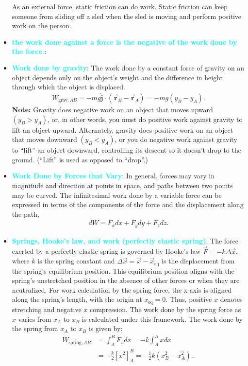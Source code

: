 \documentclass{report}
\begin{document}
\begin{itemize}
            \bigbreak \noindent 
            As an external force, static friction can do work. Static friction can keep someone from sliding off a sled when the sled is moving and perform positive work on the person. 
        \item \textbf{\textcolor{cyan}{the work done against a force is the negative of the work done by the force.}}:
        \item \textbf{\textcolor{cyan}{Work done by gravity}}: The work done by a constant force of gravity on an object depends only on the object’s weight and the difference in height through which the object is displaced.
            \begin{align*}
                W_{\text{grav},AB} = -mg\hat{\mathbf{j}} \cdot (\vec{\mathbf{r}}_B - \vec{\mathbf{r}}_A) = -mg(y_B - y_A)
            .\end{align*}
            \textbf{Note:} Gravity does negative work on an object that moves upward $(y_B > y_A)$, or, in other words, you must do positive work against gravity to lift an object upward. Alternately, gravity does positive work on an object that moves downward $(y_B < y_A)$, or you do negative work against gravity to “lift” an object downward, controlling its descent so it doesn’t drop to the ground. (“Lift” is used as opposed to “drop”.)
        \item \textbf{\textcolor{cyan}{Work Done by Forces that Vary}}: In general, forces may vary in magnitude and direction at points in space, and paths between two points may be curved. The infinitesimal work done by a variable force can be expressed in terms of the components of the force and the displacement along the path,
            \begin{align*}
                dW = F_{x}dx + F_{y}dy + F_{z}dz
            .\end{align*}
        \item \textbf{\textcolor{cyan}{Springs, Hooke's law, and work (perfectly elastic spring)}}:
            The force exerted by a perfectly elastic spring is governed by Hooke's law $\vec{F} = -k\Delta\vec{x}$, where $k$ is the spring constant and $\Delta\vec{x} = \vec{x} - \vec{x}_{\text{eq}}$ is the displacement from the spring's equilibrium position. This equilibrium position aligns with the spring's unstretched position in the absence of other forces or when they are neutralized. For work calculation by the spring force, the x-axis is aligned along the spring's length, with the origin at $x_{\text{eq}} = 0$. Thus, positive $x$ denotes stretching and negative $x$ compression. The work done by the spring force as $x$ varies from $x_A$ to $x_B$ is calculated under this framework.
            \bigbreak \noindent 
            The work done by the spring from \( x_A \) to \( x_B \) is given by:
            \begin{align*}
                W_{\text{spring},AB} &= \int_{A}^{B} F_x dx = -k \int_{A}^{B} x dx  \\
                &= -\frac{k}{2} \left[ x^2 \right]_{A}^{B} = -\frac{1}{2}k(x_B^2 - x_A^2).
            .\end{align*}
            \bigbreak \noindent 
            

\end{itemize}
\end{document}
